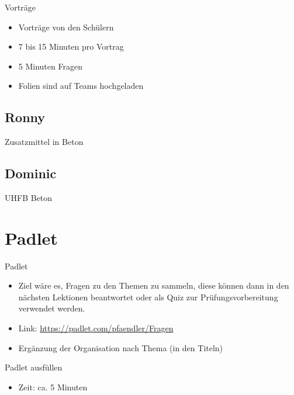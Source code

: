 \begin{frame}{Vorträge}
    \begin{itemize}
        \item[\textbullet] Vorträge von den Schülern
        \item[\textbullet] 7 bis 15 Minuten pro Vortrag
        \item[\textbullet] 5 Minuten Fragen
        \item[\textbullet] Folien sind auf Teams hochgeladen
    \end{itemize}
\end{frame}

\subsection{Ronny}
\begin{frame}{Zusatzmittel in Beton}

    
\end{frame}

\subsection{Dominic}
\begin{frame}{UHFB Beton}
\end{frame}




\section{Padlet}
\BlueSectionSlide
\begin{frame}{Padlet}
    \begin{itemize}
        \item[\textbullet] Ziel wäre es, Fragen zu den Themen zu sammeln, diese können dann in den nächsten Lektionen beantwortet oder als Quiz zur Prüfungsvorbereitung verwendet werden.
        \item[\textbullet] Link: \url{https://padlet.com/pfaendler/Fragen}
        \item[\textbullet] Ergänzung der Organisation nach Thema (in den Titeln)
    \end{itemize}
\end{frame}


\begin{frame}{Padlet ausfüllen}

    \begin{itemize}
        \item Zeit: ca. 5 Minuten
    \end{itemize}

\end{frame}




